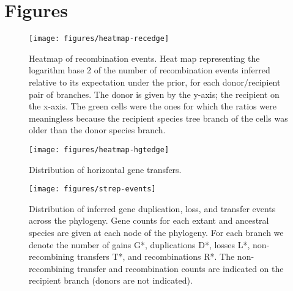 \documentclass[english]{article}
\begin{document}
\section*{Figures\clearpage{}}

\begin{figure}
\texttt{[image: figures/heatmap-recedge]}
\caption{\label{fig:Heatmap-of-recombination}Heatmap of recombination events.
Heat map representing the logarithm base 2 of the number of recombination
events inferred relative to its expectation under the prior, for each
donor/recipient pair of branches. The donor is given by the y-axis;
the recipient on the x-axis.  The
green cells were the ones for which the ratios were meaningless because
the recipient species tree branch of the cells was older than the
donor species branch.}
\end{figure}
\clearpage{}%

\begin{figure}
\begin{center}
\texttt{[image: figures/heatmap-hgtedge]}
\end{center}
\caption{Distribution of horizontal gene transfers.}
\label{fig:hgt-heatmap}
\end{figure}
\clearpage{}%

\begin{figure}
\texttt{[image: figures/strep-events]}
\caption{\label{fig:Gene-duplication-loss} Distribution of inferred
  gene duplication, loss, and transfer events across the phylogeny.
  Gene counts for each extant and ancestral species are given at each
  node of the phylogeny.  For each branch we denote the number of gains
  G*, duplications D*, losses L*, non-recombining transfers T*, and 
  recombinations R*.  The non-recombining transfer and recombination counts
  are indicated on the recipient branch (donors are not indicated).}
\end{figure}
\clearpage{}%


\clearpage{}\setcounter{figure}{0}
\setcounter{table}{0}
\renewcommand{\figurename}{Supplementary Figure}
\renewcommand{\tablename}{Supplementary Table}
\end{document}
